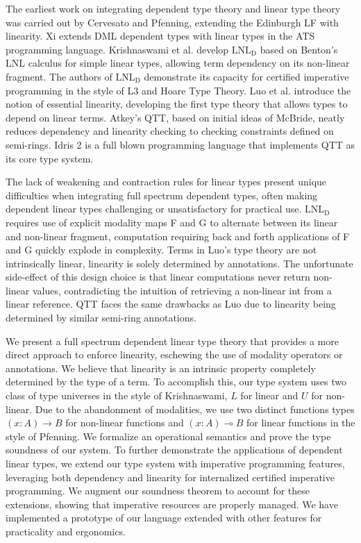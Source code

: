 \documentclass{article}
\newcommand{\LNLD}{\text{LNL}_\text{D}}
\begin{document}
  The earliest work on integrating dependent type theory and linear type theory was carried out by Cervesato and Pfenning, extending the Edinburgh LF with linearity. Xi extends DML dependent types with linear types in the ATS programming language. Krishnaswami et al. develop $\LNLD$ based on Benton's LNL calculus for simple linear types, allowing term dependency on its non-linear fragment. The authors of $\LNLD$ demonstrate its capacity for certified imperative programming in the style of L3 and Hoare Type Theory.  Luo et al. introduce the notion of essential linearity, developing the first type theory that allows types to depend on linear terms. Atkey's QTT, based on initial ideas of McBride, neatly reduces dependency and linearity checking to checking constraints defined on semi-rings. Idris 2 is a full blown programming language that implements QTT as its core type system.

  The lack of weakening and contraction rules for linear types present unique difficulties when integrating full spectrum dependent types, often making dependent linear types challenging or unsatisfactory for practical use. $\LNLD$ requires use of explicit modality maps F and G to alternate between its linear and non-linear fragment, computation requiring back and forth applications of F and G quickly explode in complexity. Terms in Luo's type theory are not intrinsically linear, linearity is solely determined by annotations. The unfortunate side-effect of this design choice is that linear computations never return non-linear values, contradicting the intuition of retrieving a non-linear int from a linear reference. QTT faces the same drawbacks as Luo due to linearity being determined by similar semi-ring annotations.
  
  We present a full spectrum dependent linear type theory that provides a more direct approach to enforce linearity, eschewing the use of modality operators or annotations. We believe that linearity is an intrinsic property completely determined by the type of a term. To accomplish this, our type system uses two class of type universes in the style of Krishnaswami, $L$ for linear and $U$ for non-linear. Due to the abandonment of modalities, we use two distinct functions types $(x : A) \rightarrow B$ for non-linear functions and $(x : A) \multimap B$ for linear functions in the style of Pfenning. We formalize an operational semantics and prove the type soundness of our system. To further demonstrate the applications of dependent linear types, we extend our type system with imperative programming features, leveraging both dependency and linearity for internalized certified imperative programming. We augment our soundness theorem to account for these extensions, showing that imperative resources are properly managed. We have implemented a prototype of our language extended with other features for practicality and ergonomics.
\end{document}
